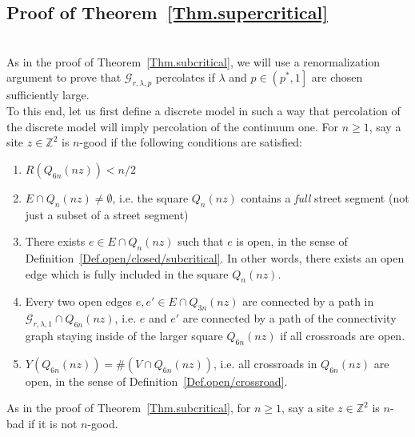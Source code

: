 \documentclass[10pt,a4paper]{amsart}
\theoremstyle{exampstyle}
\theoremstyle{exampnotations}
\begin{document}
\subsection{Proof of Theorem~\ref{Thm.supercritical}}\mbox{}\\
As in the proof of Theorem~\ref{Thm.subcritical}, we will use a renormalization argument to prove that $\mathcal{G}_{r, \lambda, p}$ percolates if $\lambda$ and $p \in \left(p^{*},1\right]$ are chosen sufficiently large. \\
To this end, let us first define a discrete model in such a way that percolation of the discrete model will imply percolation of the continuum one. For $n \geq 1$, say a site $z \in \mathbb{Z}^{2}$ is $n$-good if the following conditions are satisfied:
\begin{enumerate}
\item $R(Q_{6n}(nz)) < n/2$
\item $E \cap Q_n(nz) \neq \emptyset$, i.e. the square $Q_n(nz)$ contains a \emph{full} street segment (not just a subset of a street segment)
\item There exists $e \in E \cap Q_n(nz)$ such that $e$ is open, in the sense of Definition~\ref{Def.open/closed/subcritical}. In other words, there exists an open edge which is fully included in the square $Q_n(nz)$.
\item Every two open edges $e,e' \in E \cap Q_{3n}(nz)$ are connected by a path in $\mathcal{G}_{r,\lambda,1}\cap Q_{6n}(nz)$, i.e. $e$ and $e'$ are connected by a path of the connectivity graph staying inside of the larger square $Q_{6n}(nz)$ if all crossroads are open.
\item $Y(Q_{6n}(nz)) = \#(V \cap Q_{6n}(nz))$, i.e. all crossroads in $Q_{6n}(nz)$ are open, in the sense of Definition~\ref{Def.open/crossroad}.
\end{enumerate}
As in the proof of Theorem~\ref{Thm.subcritical}, for $n \geq 1$, say a site $z \in \mathbb{Z}^{2}$ is $n$-bad if it is not $n$-good. \\
\end{document}
